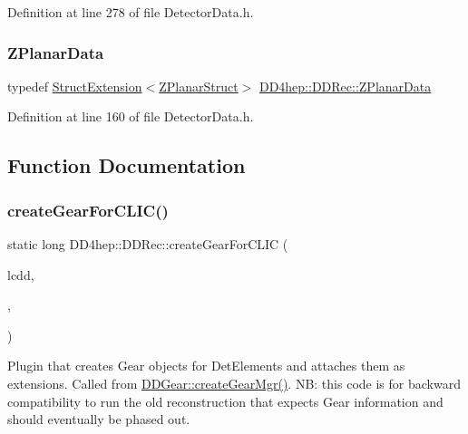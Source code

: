Definition at line 278 of file Detector\+Data.\+h.

\hypertarget{namespace_d_d4hep_1_1_d_d_rec_a33d4dff6a0b5ce47e490b050a3c5f69a}{}\label{namespace_d_d4hep_1_1_d_d_rec_a33d4dff6a0b5ce47e490b050a3c5f69a} 
\subsubsection{\texorpdfstring{Z\+Planar\+Data}{ZPlanarData}}
{\footnotesize\ttfamily typedef \hyperlink{struct_d_d4hep_1_1_d_d_rec_1_1_struct_extension}{Struct\+Extension}$<$\hyperlink{struct_d_d4hep_1_1_d_d_rec_1_1_z_planar_struct}{Z\+Planar\+Struct}$>$ \hyperlink{namespace_d_d4hep_1_1_d_d_rec_a33d4dff6a0b5ce47e490b050a3c5f69a}{D\+D4hep\+::\+D\+D\+Rec\+::\+Z\+Planar\+Data}}



Definition at line 160 of file Detector\+Data.\+h.



\subsection{Function Documentation}
\hypertarget{namespace_d_d4hep_1_1_d_d_rec_a8eda7f805466b45870d45a7eea090a98}{}\label{namespace_d_d4hep_1_1_d_d_rec_a8eda7f805466b45870d45a7eea090a98} 
\subsubsection{\texorpdfstring{create\+Gear\+For\+C\+L\+I\+C()}{createGearForCLIC()}}
{\footnotesize\ttfamily static long D\+D4hep\+::\+D\+D\+Rec\+::create\+Gear\+For\+C\+L\+IC (\begin{DoxyParamCaption}\item[{\hyperlink{class_d_d4hep_1_1_geometry_1_1_l_c_d_d}{L\+C\+DD} \&}]{lcdd,  }\item[{int}]{,  }\item[{char $\ast$$\ast$}]{ }\end{DoxyParamCaption})\hspace{0.3cm}{\ttfamily [static]}}

Plugin that creates Gear objects for Det\+Elements and attaches them as extensions. Called from \hyperlink{namespace_d_d4hep_aeaa49904e5fff3d47fa8fd9600655f3e}{D\+D\+Gear\+::create\+Gear\+Mgr()}. NB\+: this code is for backward compatibility to run the old reconstruction that expects Gear information and should eventually be phased out.

